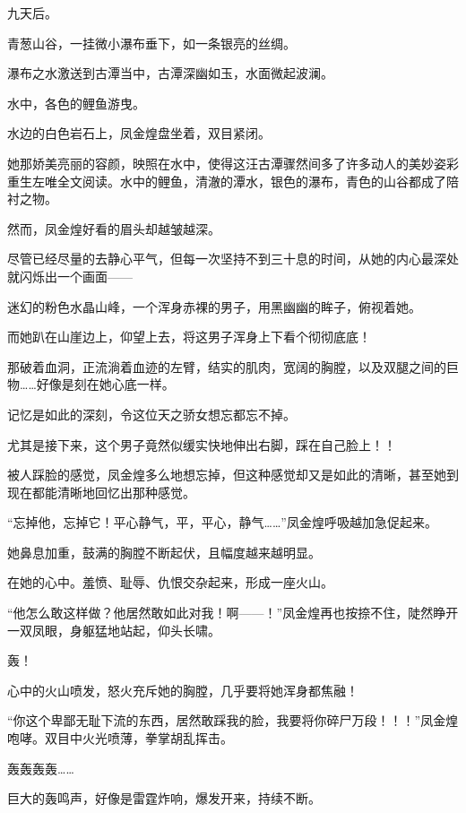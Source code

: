 
\begin{this_body}



九天后。

青葱山谷，一挂微小瀑布垂下，如一条银亮的丝绸。

瀑布之水激送到古潭当中，古潭深幽如玉，水面微起波澜。

水中，各色的鲤鱼游曳。

水边的白色岩石上，凤金煌盘坐着，双目紧闭。

她那娇美亮丽的容颜，映照在水中，使得这汪古潭骤然间多了许多动人的美妙姿彩重生左唯全文阅读。水中的鲤鱼，清澈的潭水，银色的瀑布，青色的山谷都成了陪衬之物。

然而，凤金煌好看的眉头却越皱越深。

尽管已经尽量的去静心平气，但每一次坚持不到三十息的时间，从她的内心最深处就闪烁出一个画面——

迷幻的粉色水晶山峰，一个浑身赤裸的男子，用黑幽幽的眸子，俯视着她。

而她趴在山崖边上，仰望上去，将这男子浑身上下看个彻彻底底！

那破着血洞，正流淌着血迹的左臂，结实的肌肉，宽阔的胸膛，以及双腿之间的巨物……好像是刻在她心底一样。

记忆是如此的深刻，令这位天之骄女想忘都忘不掉。

尤其是接下来，这个男子竟然似缓实快地伸出右脚，踩在自己脸上！！

被人踩脸的感觉，凤金煌多么地想忘掉，但这种感觉却又是如此的清晰，甚至她到现在都能清晰地回忆出那种感觉。

“忘掉他，忘掉它！平心静气，平，平心，静气……”凤金煌呼吸越加急促起来。

她鼻息加重，鼓满的胸膛不断起伏，且幅度越来越明显。

在她的心中。羞愤、耻辱、仇恨交杂起来，形成一座火山。

“他怎么敢这样做？他居然敢如此对我！啊——！”凤金煌再也按捺不住，陡然睁开一双凤眼，身躯猛地站起，仰头长啸。

轰！

心中的火山喷发，怒火充斥她的胸膛，几乎要将她浑身都焦融！

“你这个卑鄙无耻下流的东西，居然敢踩我的脸，我要将你碎尸万段！！！”凤金煌咆哮。双目中火光喷薄，拳掌胡乱挥击。

轰轰轰轰……

巨大的轰鸣声，好像是雷霆炸响，爆发开来，持续不断。


\end{this_body}
